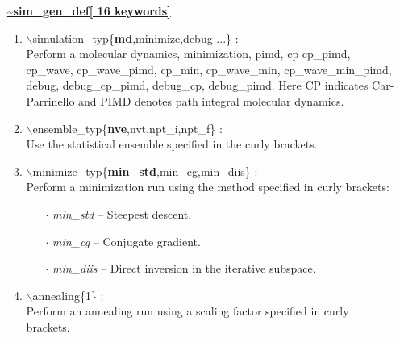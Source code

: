 \begin{itemize}
\huge
\item[] \underline{\bf \~{}sim\_gen\_def[ 16 keywords]}
\begin{enumerate}

 \vspace{0.15in} \Large
 \item $\backslash$simulation\_typ\{{\bf md},minimize,debug ...\} : \\
     \large
     Perform a molecular dynamics, minimization, pimd, cp
     cp\_pimd, cp\_wave, cp\_wave\_pimd, cp\_min, cp\_wave\_min,
     cp\_wave\_min\_pimd,
     debug, debug\_cp\_pimd, debug\_cp, debug\_pimd. Here CP indicates
     Car-Parrinello and PIMD  denotes path integral molecular dynamics.

 \vspace{0.15in} \Large
 \item  $\backslash$ensemble\_typ\{{\bf nve},nvt,npt\_i,npt\_f\} : \\
     \large
     Use the statistical ensemble specified in the curly brackets.

 \vspace{0.15in} \Large
 \item  $\backslash$minimize\_typ\{{\bf min\_std},min\_cg,min\_diis\} : \\
     \large
     Perform a minimization run using the method specified in curly brackets:
     \begin{itemize}
        \item[$\cdot$] {\it min\_std} -- Steepest descent.
        \item[$\cdot$] {\it min\_cg} -- Conjugate gradient.
        \item[$\cdot$] {\it min\_diis} -- Direct inversion in the 
                                          iterative subspace.
     \end{itemize}

 \vspace{0.15in} \Large
 \item  $\backslash$annealing\{1\} : \\
     \large
     Perform an annealing run using a scaling factor specified in curly
     brackets.


\end{enumerate}
\end{itemize}
